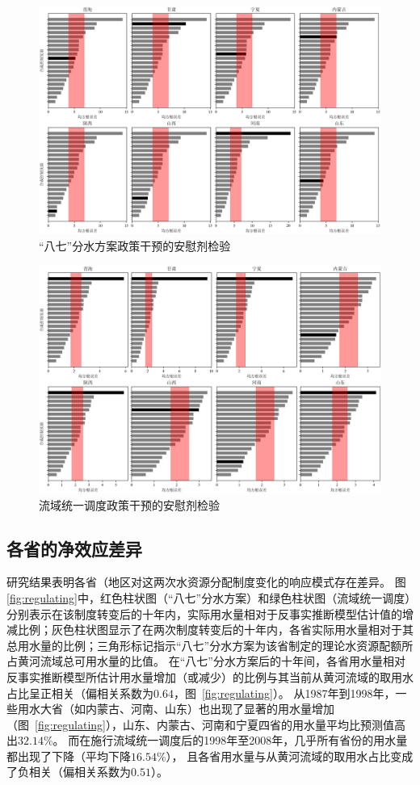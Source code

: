 \begin{figure}
    \includegraphics[width=0.9\linewidth]{img/ch5/ch5_rmse_87.png}
    \centering
    \caption{“八七”分水方案政策干预的安慰剂检验}\label{fig:87placebo}
\end{figure}

\begin{figure}
    \includegraphics[width=0.9\linewidth]{img/ch5/ch5_rmse_98.png}
    \centering
    \caption{流域统一调度政策干预的安慰剂检验}\label{fig:98placebo}
\end{figure}


\subsection{各省的净效应差异}\label{result-3}

研究结果表明各省（地区对这两次水资源分配制度变化的响应模式存在差异。
图\ref{fig:regulating}中，红色柱状图（“八七”分水方案）和绿色柱状图（流域统一调度）分别表示在该制度转变后的十年内，实际用水量相对于反事实推断模型估计值的增减比例；灰色柱状图显示了在两次制度转变后的十年内，各省实际用水量相对于其总用水量的比例；三角形标记指示“八七”分水方案为该省制定的理论水资源配额所占黄河流域总可用水量的比值。
在“八七”分水方案后的十年间，各省用水量相对反事实推断模型所估计用水量增加（或减少）的比例与其当前从黄河流域的取用水占比呈正相关（偏相关系数为$0.64$，图~\ref{fig:regulating}）。
从1987年到1998年，一些用水大省（如内蒙古、河南、山东）也出现了显著的用水量增加（图~\ref{fig:regulating}），山东、内蒙古、河南和宁夏四省的用水量平均比预测值高出$32.14\%$。
而在施行流域统一调度后的1998年至2008年，几乎所有省份的用水量都出现了下降（平均下降$16.54\%$），
且各省用水量与从黄河流域的取用水占比变成了负相关（偏相关系数为$0.51$）。

